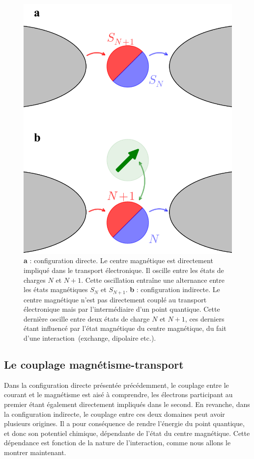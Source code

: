 \begin{figure}
\parbox{6.5cm}{
\centering \includegraphics[scale=0.45]{Resultats/DirVsInd/DirVsInd.pdf} 
}
\parbox{7.5cm}{
\caption{\textbf{a} : configuration directe. Le centre magnétique est directement impliqué dans le transport électronique. Il oscille entre les états de charges $N$ et $N+1$. Cette oscillation entraîne une alternance entre les états magnétiques $S_{N}$ et $S_{N+1}$. \textbf{b} : configuration indirecte. Le centre magnétique n'est pas directement couplé au transport électronique mais par l'intermédiaire d'un point quantique. Cette dernière oscille entre deux états de charge $N$ et $N+1$, ces derniers étant influencé par l'état magnétique du centre magnétique, du fait d'une interaction~(exchange, dipolaire etc.).}
\label{DirVsInd}
}
\end{figure}


\subsection{Le couplage magnétisme-transport}
Dans la configuration directe présentée précédemment, le couplage entre le courant et le magnétisme est aisé à comprendre, les électrons participant au premier étant également directement impliqués dans le second. En revanche, dans la configuration indirecte, le couplage entre ces deux domaines peut avoir plusieurs origines. Il a pour conséquence de rendre l'énergie du point quantique, et donc son potentiel chimique, dépendante de l'état du centre magnétique. Cette dépendance est fonction de la nature de l'interaction, comme nous allons le montrer maintenant.

